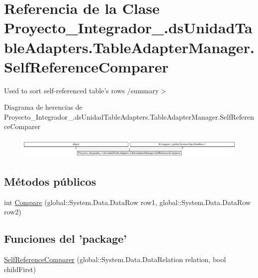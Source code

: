 \hypertarget{class_proyecto___integrador__3_1_1ds_unidad_table_adapters_1_1_table_adapter_manager_1_1_self_reference_comparer}{\section{Referencia de la Clase Proyecto\-\_\-\-Integrador\-\_.\-ds\-Unidad\-Table\-Adapters.\-Table\-Adapter\-Manager.\-Self\-Reference\-Comparer}
\label{class_proyecto___integrador__3_1_1ds_unidad_table_adapters_1_1_table_adapter_manager_1_1_self_reference_comparer}
}


Used to sort self-\/referenced table's rows /summary$>$  


Diagrama de herencias de Proyecto\-\_\-\-Integrador\-\_.\-ds\-Unidad\-Table\-Adapters.\-Table\-Adapter\-Manager.\-Self\-Reference\-Comparer\begin{figure}[H]
\begin{center}
\leavevmode
\includegraphics[height=1.000000cm]{class_proyecto___integrador__3_1_1ds_unidad_table_adapters_1_1_table_adapter_manager_1_1_self_reference_comparer}
\end{center}
\end{figure}
\subsection*{Métodos públicos}
\begin{DoxyCompactItemize}
\item 
int \hyperlink{class_proyecto___integrador__3_1_1ds_unidad_table_adapters_1_1_table_adapter_manager_1_1_self_reference_comparer_ac9d7f18f49ab41e15559caf23c836a67}{Compare} (global\-::\-System.\-Data.\-Data\-Row row1, global\-::\-System.\-Data.\-Data\-Row row2)
\end{DoxyCompactItemize}
\subsection*{Funciones del 'package'}
\begin{DoxyCompactItemize}
\item 
\hyperlink{class_proyecto___integrador__3_1_1ds_unidad_table_adapters_1_1_table_adapter_manager_1_1_self_reference_comparer_a7e477770e6d76147fa1fcdfea080ce2c}{Self\-Reference\-Comparer} (global\-::\-System.\-Data.\-Data\-Relation relation, bool child\-First)
\end{DoxyCompactItemize}
